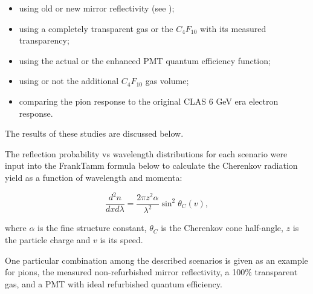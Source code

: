 \begin{itemize}
	\item using old or new mirror reflectivity (see );
	\item using a completely transparent gas or the $C_4F_{10}$ with its measured transparency;
	\item using the actual or the enhanced PMT quantum efficiency function;
	\item using or not the additional $C_4F_{10}$ gas volume;
	\item comparing the pion response to the original CLAS 6 GeV era electron response.
\end{itemize}

The results of these studies are discussed below.

The reflection probability vs wavelength distributions for each scenario were input into
the Frank\textendash Tamm formula \cite{Frank:1937fk} below to calculate
the Cherenkov radiation yield as a function of wavelength and momenta:


\begin{equation} \label{eq:cerenkov}
	\frac{d^2n}{dxd\lambda} = \frac{2\pi z^2\alpha}{\lambda^2}\sin^2{\theta_C(v)},
\end{equation}

\noindent
where $\alpha$ is the fine structure constant, $\theta_C$ is the Cherenkov cone half-angle, $z$ is the particle charge and $v$ is its speed.

One particular combination among the described scenarios is given as an example  for pions,
the measured non-refurbished mirror reflectivity, a 100$\%$ transparent gas, and a PMT with ideal refurbished quantum efficiency.

